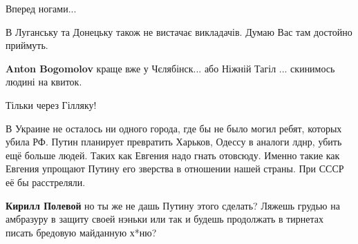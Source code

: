 \begin{itemize}
\begin{itemize}
Вперед ногами...
\end{itemize}

 
В Луганську та Донецьку також не вистачає викладачів. Думаю Вас там достойно приймуть.

\begin{itemize}
 
\textbf{Anton Bogomolov} краще вже у Чєлябінск... або Ніжній Тагіл ... скинимось людині на квиток.

 
Тільки через Гілляку!
\end{itemize}

 

В Украине не осталось ни одного города, где бы не было могил ребят, которых
убила РФ. Путин планирует превратить Харьков, Одессу в аналоги лднр, убить ещё
больше людей. Таких как Евгения надо гнать отовсюду. Именно такие как Евгения
упрощают Путину его зверства в отношении нашей страны. При СССР её бы
расстреляли.

\begin{itemize}
 
\textbf{Кирилл Полевой} но ты же не дашь Путину этого сделать? Ляжешь грудью на амбразуру в защиту своей нэньки или так и будешь продолжать в тирнетах писать бредовую майданную х*ню?

 

\end{itemize}
\end{itemize}
